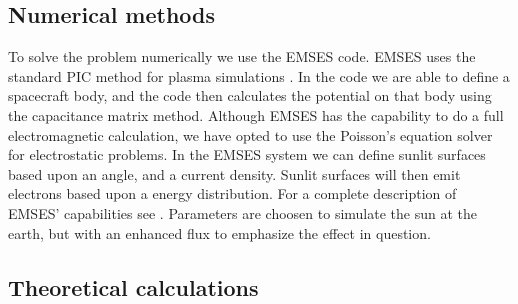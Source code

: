 \subsection{Numerical methods}

To solve the problem numerically we use the EMSES code. EMSES uses the standard PIC method for plasma simulations \citep{birdsall2004plasma}.
In the code we are able to define a spacecraft body, and the code then calculates the potential on that body using the capacitance matrix method.
Although EMSES has the capability to do a full electromagnetic calculation, we have opted to use the Poisson's equation
solver for electrostatic problems. In the EMSES system we can define sunlit surfaces based upon an angle, and a current
density. Sunlit surfaces will then emit electrons based upon a energy distribution. For a complete description of EMSES' capabilities
see \citep{nakashima_ohhelp:_2009}. Parameters are choosen to simulate the sun at the earth, but with an enhanced flux to emphasize the effect in question.

\subsection{Theoretical calculations}

